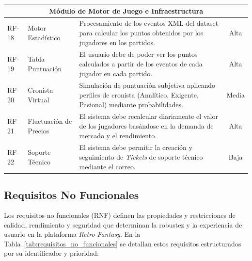 \begin{center}
\begin{longtable}{|l|p{3.5cm}|p{7cm}|c|}
    \multicolumn{4}{|c|}{\textbf{Módulo de Motor de Juego e Infraestructura}} \\
    \hline
    RF-18 & Motor Estadístico & Procesamiento de los eventos XML del dataset para calcular los puntos obtenidos por los jugadores en los partidos. & Alta \\ \hline
    RF-19 & Tabla Puntuación & El usuario debe de poder ver los puntos calculados a partir de los eventos de cada jugador en cada partido. & Alta \\ \hline
    RF-20 & Cronista Virtual & Simulación de puntuación subjetiva aplicando perfiles de cronista (Analítico, Exigente, Pasional) mediante probabilidades. & Media \\ \hline
    RF-21 & Fluctuación de Precios & El sistema debe recalcular diariamente el valor de los jugadores basándose en la demanda de mercado y el rendimiento. & Alta \\ \hline
    RF-22 & Soporte Técnico & El sistema debe permitir la creación y seguimiento de \textit{Tickets} de soporte técnico mediante el correo. & Baja \\ \hline
\end{longtable}
\end{center}

\subsection{Requisitos No Funcionales}
Los requisitos no funcionales (RNF) definen las propiedades y restricciones de calidad, rendimiento y seguridad que determinan la robustez y la experiencia de usuario en la plataforma \textit{Retro Fantasy}. En la Tabla~\ref{tab:requisitos_no_funcionales} se detallan estos requisitos estructurados por su identificador y prioridad:

